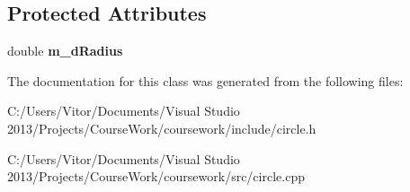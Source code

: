 \subsection*{Protected Attributes}
\begin{DoxyCompactItemize}
\item 
\hypertarget{class_circle_a7a3cd116a5a35b05ac342072b74c0fd4}{}double {\bfseries m\+\_\+d\+Radius}\label{class_circle_a7a3cd116a5a35b05ac342072b74c0fd4}

\end{DoxyCompactItemize}


The documentation for this class was generated from the following files\+:\begin{DoxyCompactItemize}
\item 
C\+:/\+Users/\+Vitor/\+Documents/\+Visual Studio 2013/\+Projects/\+Course\+Work/coursework/include/circle.\+h\item 
C\+:/\+Users/\+Vitor/\+Documents/\+Visual Studio 2013/\+Projects/\+Course\+Work/coursework/src/circle.\+cpp\end{DoxyCompactItemize}
